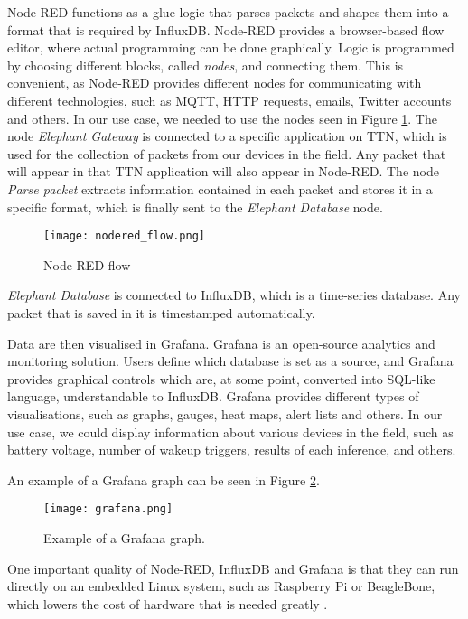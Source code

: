 Node-RED functions as a glue logic that parses packets and shapes them into a format that is required by InfluxDB.
Node-RED provides a browser-based flow editor, where actual programming can be done graphically.
Logic is programmed by choosing different blocks, called \textit{nodes}, and connecting them.
This is convenient, as Node-RED provides different nodes for communicating with different technologies, such as MQTT, HTTP requests, emails, Twitter accounts and others.
In our use case, we needed to use the nodes seen in Figure \ref{nodered_flow}.
The node \textit{Elephant Gateway} is connected to a specific application on TTN, which is used for the collection of packets from our devices in the field.
Any packet that will appear in that TTN application will also appear in Node-RED.
The node \textit{Parse packet} extracts information contained in each packet and stores it in a specific format, which is finally sent to the \textit{Elephant Database} node.

\begin{figure}[ht]
    \centering
    \texttt{[image: nodered\_flow.png]} 
    \caption{ Node-RED flow}
    \label{nodered_flow}
\end{figure}

\textit{Elephant Database} is connected to InfluxDB, which is a time-series database.
Any packet that is saved in it is timestamped automatically.

Data are then visualised in Grafana. 
Grafana is an open-source analytics and monitoring solution.
Users define which database is set as a source, and Grafana provides graphical controls which are, at some point, converted into SQL-like language, understandable to InfluxDB.
Grafana provides different types of visualisations, such as graphs, gauges, heat maps, alert lists and others.
In our use case, we could display information about various devices in the field, such as battery voltage, number of wakeup triggers, results of each inference, and others.

An example of a Grafana graph can be seen in Figure \ref{grafana}.
\newline
\begin{figure}[ht]
    \centering
    \texttt{[image: grafana.png]} 
    \caption{ Example of a Grafana graph.}
    \label{grafana}
\end{figure}

One important quality of Node-RED, InfluxDB and Grafana is that they can run directly on an embedded Linux system, such as Raspberry Pi or BeagleBone, which lowers the cost of hardware that is needed greatly .
